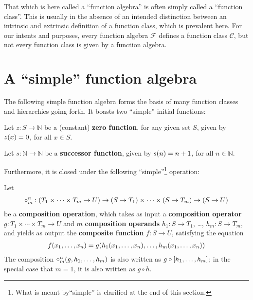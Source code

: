 \begin{remark} That which is here called a ``function algebra'' is often simply
called a ``function class''. This is usually in the absence of an intended
distinction between an intrinsic and extrinsic definition of a function class,
which is prevalent here. For our intents and purposes, every function algebra
$\mathcal{F}$ defines a function class $\mathcal{C}$, but not every function
class is given by a function algebra.  \end{remark} 

\section{A ``simple'' function algebra}

The following simple function algebra forms the basis of many function classes
and hierarchies going forth. It boasts two ``simple'' initial functions:

\begin{definition} \label{def:zero-function} Let $z : S \rightarrow \mathbb{N}$
be a (constant) \textbf{zero function}, for any given set $S$, given by $z{\mathopen{}\left({x}\right)\mathclose{}}
= 0$, for all $x \in S$.   \end{definition}

\begin{definition} \label{def:successor-function} Let $s : \mathbb{N}
\rightarrow \mathbb{N}$ be a \textbf{successor function}, given by $s{\mathopen{}\left({n}\right)\mathclose{}} = n
+ 1$, for all $n \in \mathbb{N}$.  \end{definition}

Furthermore, it is closed under the following ``simple''\footnote{What is meant
by``simple'' is clarified at the end of this section.} operation:

\begin{definition} \label{def:composition-operation} Let\begin{align*}
%
\circ^n_m : \p{T_1 \times \cdots \times T_m \rightarrow U} \rightarrow \p{S
\rightarrow T_1} \times \cdots \times \p{S \rightarrow T_m} \rightarrow \p{S
\rightarrow U}
%
\end{align*}be a \textbf{composition operation}, which takes as input a
\textbf{composition operator} $g : T_1 \times \cdots \times T_m \rightarrow U$
and $m$ \textbf{composition operands} $h_1 : S \rightarrow T_1$, \ldots, $h_m :
S \rightarrow T_m$, and yields as output the \textbf{composite function} $f : S
\rightarrow U$, satisfying the equation\begin{align*}
%
f\p{x_1,\ldots,x_n} = g\p{h_1\p{x_1,\ldots,x_n}, \ldots, h_m\p{x_1,
\ldots,x_n}}
%
\end{align*} The composition $\circ^n_m{\mathopen{}\left({g,h_1, \ldots, h_m}\right)\mathclose{}}$ is also written
as $g \circ \mathopen{}\left[{h_1, \ldots, h_m}\right]\mathclose{}$; in the special case that $m=1$, it is also
written as $g \circ h$.\end{definition}

